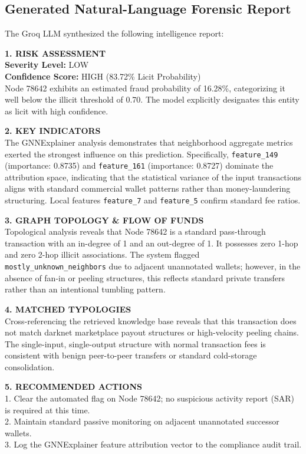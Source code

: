 \documentclass[11pt,a4paper]{report}
\begin{document}
\subsection{Generated Natural-Language Forensic Report}
The Groq LLM synthesized the following intelligence report:
\begin{tcolorbox}[colback=boxbg,colframe=darkblue,title=\textbf{Generated Forensic Investigation Audit Report}]
\small
\textbf{1. RISK ASSESSMENT}\\
\textbf{Severity Level:} LOW\\
\textbf{Confidence Score:} HIGH (83.72\% Licit Probability)\\
Node 78642 exhibits an estimated fraud probability of 16.28\%, categorizing it well below the illicit threshold of 0.70. The model explicitly designates this entity as licit with high confidence.

\vspace{0.3cm}
\textbf{2. KEY INDICATORS}\\
The GNNExplainer analysis demonstrates that neighborhood aggregate metrics exerted the strongest influence on this prediction. Specifically, \texttt{feature\_149} (importance: 0.8735) and \texttt{feature\_161} (importance: 0.8727) dominate the attribution space, indicating that the statistical variance of the input transactions aligns with standard commercial wallet patterns rather than money-laundering structuring. Local features \texttt{feature\_7} and \texttt{feature\_5} confirm standard fee ratios.

\vspace{0.3cm}
\textbf{3. GRAPH TOPOLOGY \& FLOW OF FUNDS}\\
Topological analysis reveals that Node 78642 is a standard pass-through transaction with an in-degree of 1 and an out-degree of 1. It possesses zero 1-hop and zero 2-hop illicit associations. The system flagged \texttt{mostly\_unknown\_neighbors} due to adjacent unannotated wallets; however, in the absence of fan-in or peeling structures, this reflects standard private transfers rather than an intentional tumbling pattern.

\vspace{0.3cm}
\textbf{4. MATCHED TYPOLOGIES}\\
Cross-referencing the retrieved knowledge base reveals that this transaction does not match darknet marketplace payout structures or high-velocity peeling chains. The single-input, single-output structure with normal transaction fees is consistent with benign peer-to-peer transfers or standard cold-storage consolidation.

\vspace{0.3cm}
\textbf{5. RECOMMENDED ACTIONS}\\
1. Clear the automated flag on Node 78642; no suspicious activity report (SAR) is required at this time.\\
2. Maintain standard passive monitoring on adjacent unannotated successor wallets.\\
3. Log the GNNExplainer feature attribution vector to the compliance audit trail.
\end{tcolorbox}
\end{document}
